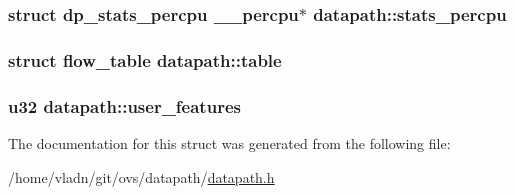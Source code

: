 \subsubsection[{stats\+\_\+percpu}]{\setlength{\rightskip}{0pt plus 5cm}struct {\bf dp\+\_\+stats\+\_\+percpu} {\bf \+\_\+\+\_\+percpu}$\ast$ datapath\+::stats\+\_\+percpu}\label{structdatapath_a26ff295c711206c8177cdc89150c6a4a}
\hypertarget{structdatapath_ac6d67fe586c19484391acbcfa267259d}{}
\subsubsection[{table}]{\setlength{\rightskip}{0pt plus 5cm}struct {\bf flow\+\_\+table} datapath\+::table}\label{structdatapath_ac6d67fe586c19484391acbcfa267259d}
\hypertarget{structdatapath_a92ce3b704c20f18b3a696f98b6f7d266}{}
\subsubsection[{user\+\_\+features}]{\setlength{\rightskip}{0pt plus 5cm}u32 datapath\+::user\+\_\+features}\label{structdatapath_a92ce3b704c20f18b3a696f98b6f7d266}


The documentation for this struct was generated from the following file\+:\begin{DoxyCompactItemize}
\item 
/home/vladn/git/ovs/datapath/\hyperlink{datapath_8h}{datapath.\+h}\end{DoxyCompactItemize}
